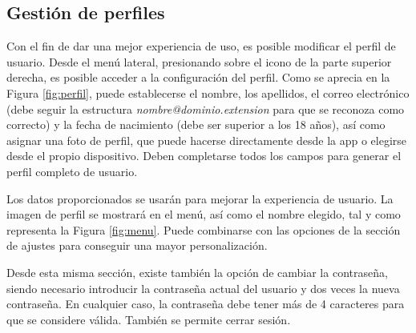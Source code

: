 \subsection{Gestión de perfiles}

Con el fin de dar una mejor experiencia de uso, es posible modificar el perfil de usuario. Desde el menú lateral, presionando sobre el icono de la parte superior derecha, es posible acceder a la configuración del perfil. Como se aprecia en la Figura \ref{fig:perfil}, puede establecerse el nombre, los apellidos, el correo electrónico (debe seguir la estructura \textit{nombre@dominio.extension} para que se reconoza como correcto) y la fecha de nacimiento (debe ser superior a los 18 años), así como asignar una foto de perfil, que puede hacerse directamente desde la app o elegirse desde el propio dispositivo. Deben completarse todos los campos para generar el perfil completo de usuario.

Los datos proporcionados se usarán para mejorar la experiencia de usuario. La imagen de perfil se mostrará en el menú, así como el nombre elegido, tal y como representa la Figura \ref{fig:menu}. Puede combinarse con las opciones de la sección de ajustes para conseguir una mayor personalización.

Desde esta misma sección, existe también la opción de cambiar la contraseña, siendo necesario introducir la contraseña actual del usuario y dos veces la nueva contraseña. En cualquier caso, la contraseña debe tener más de 4 caracteres para que se considere válida. También se permite cerrar sesión.

